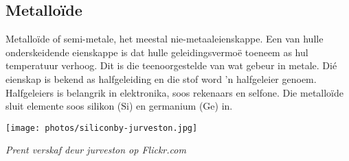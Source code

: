             \subsection*{Metallo\"ide}
            \nopagebreak
\begin{minipage}{.5\textwidth}
        \label{m38708*id66042}Metallo\"ide of semi-metale, het meestal nie-metaaleienskappe. Een van hulle onderskeidende eienskappe is dat hulle geleidingsvermoë toeneem as hul temperatuur verhoog. Dit is die teenoorgestelde van wat gebeur in metale.  Di\'e eienskap is bekend as halfgeleiding en die stof word  'n halfgeleier genoem. Halfgeleiers is belangrik in elektronika, soos rekenaars en selfone. Die metallo\"ide sluit elemente soos silikon ($\text{Si}$) en germanium ($\text{Ge}$) in.\par 
\end{minipage}
\begin{minipage}{.5\textwidth}
\begin{center}
 \texttt{[image: photos/siliconby-jurveston.jpg]}\par
\textit{Prent verskaf deur jurveston op Flickr.com}
\end{center}
\end{minipage}
\par 
      \noindent
